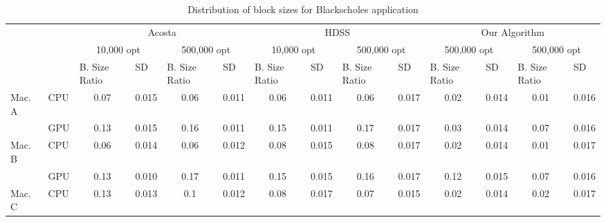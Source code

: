 \documentclass[journal]{IEEEtran}
\begin{document}
\begin{table}[htb]
\centering
\caption{Distribution of block sizes for Blackscholes application}
\begin{scriptsize}
\begin{tabular}{|l|l|l|l|l|l|l|l|l|l|l|l|l|l|}
\cline{3-14}
\multicolumn{1}{l}{} &  & \multicolumn{4}{c|}{Acosta} & \multicolumn{4}{c|}{HDSS} & \multicolumn{4}{c|}{Our Algorithm} \\ 
\cline{3-14}
\multicolumn{1}{l}{} &  & \multicolumn{2}{c|}{10,000 opt} & \multicolumn{2}{c|}{500,000 opt} & \multicolumn{2}{c|}{10,000 opt} & \multicolumn{2}{c|}{500,000 opt} & \multicolumn{2}{c|}{500,000 opt} & \multicolumn{2}{c|}{500,000 opt} \\ 
\cline{3-14}
\multicolumn{1}{l}{} &  & B. Size Ratio & SD & B. Size Ratio & SD & B. Size Ratio & SD & B. Size Ratio & SD & B. Size Ratio & SD & B. Size Ratio & SD \\ 
\hline
Mac. A & CPU & \multicolumn{1}{c|}{0.07} & \multicolumn{1}{c|}{0.015} & \multicolumn{1}{c|}{0.06} & \multicolumn{1}{c|}{0.011} & \multicolumn{1}{c|}{0.06} & \multicolumn{1}{c|}{0.011} & \multicolumn{1}{c|}{0.06} & \multicolumn{1}{c|}{0.017} & \multicolumn{1}{c|}{0.02} & \multicolumn{1}{c|}{0.014} & \multicolumn{1}{c|}{0.01} & \multicolumn{1}{c|}{0.016} \\ 
\cline{2-14}
 & GPU & \multicolumn{1}{c|}{0.13} & \multicolumn{1}{c|}{0.015} & \multicolumn{1}{c|}{0.16} & \multicolumn{1}{c|}{0.011} & \multicolumn{1}{c|}{0.15} & \multicolumn{1}{c|}{0.011} & \multicolumn{1}{c|}{0.17} & \multicolumn{1}{c|}{0.017} & \multicolumn{1}{c|}{0.03} & \multicolumn{1}{c|}{0.014} & \multicolumn{1}{c|}{0.07} & \multicolumn{1}{c|}{0.016} \\ 
\hline
Mac. B & CPU & \multicolumn{1}{c|}{0.06} & \multicolumn{1}{c|}{0.014} & \multicolumn{1}{c|}{0.06} & \multicolumn{1}{c|}{0.012} & \multicolumn{1}{c|}{0.08} & \multicolumn{1}{c|}{0.015} & \multicolumn{1}{c|}{0.08} & \multicolumn{1}{c|}{0.017} & \multicolumn{1}{c|}{0.02} & \multicolumn{1}{c|}{0.014} & \multicolumn{1}{c|}{0.01} & \multicolumn{1}{c|}{0.017} \\ 
\cline{2-14}
 & GPU & \multicolumn{1}{c|}{0.13} & \multicolumn{1}{c|}{0.010} & \multicolumn{1}{c|}{0.17} & \multicolumn{1}{c|}{0.011} & \multicolumn{1}{c|}{0.15} & \multicolumn{1}{c|}{0.015} & \multicolumn{1}{c|}{0.16} & \multicolumn{1}{c|}{0.017} & \multicolumn{1}{c|}{0.12} & \multicolumn{1}{c|}{0.015} & \multicolumn{1}{c|}{0.07} & \multicolumn{1}{c|}{0.016} \\ 
\hline
Mac. C & CPU & \multicolumn{1}{c|}{0.13} & \multicolumn{1}{c|}{0.013} & \multicolumn{1}{c|}{0.1} & \multicolumn{1}{c|}{0.012} & \multicolumn{1}{c|}{0.08} & \multicolumn{1}{c|}{0.017} & \multicolumn{1}{c|}{0.07} & \multicolumn{1}{c|}{0.015} & \multicolumn{1}{c|}{0.02} & \multicolumn{1}{c|}{0.014} & \multicolumn{1}{c|}{0.02} & \multicolumn{1}{c|}{0.017} \\ 

\end{tabular}
\end{scriptsize}
\end{table}
\end{document}
